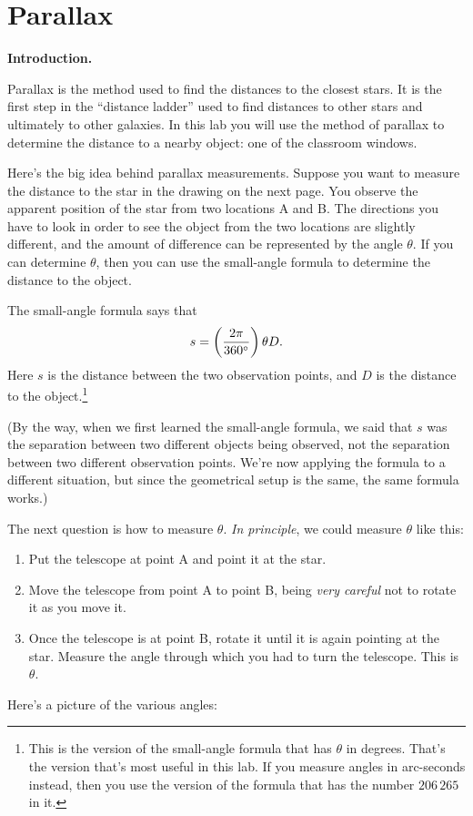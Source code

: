 \chapter{Parallax}


{\bf Introduction.}

Parallax is the method used to find the distances to the closest
stars.  It is the first step in the ``distance ladder'' used to find
distances to other stars and ultimately to other galaxies.  In this
lab you will use the method of parallax to determine the distance to a
nearby object: one of the classroom windows.

Here's the big idea behind parallax measurements.  Suppose you want
to measure the distance to the star in the drawing on the next page.  
You observe
the apparent position of the star from two locations A and B.  The directions
you have to look in order to see the object from the two locations
are slightly different, and the amount of difference can be represented
by the angle $\theta$.  If you can determine $\theta$, then you can
use the small-angle formula to determine the distance to the object.

The small-angle formula says that
$$
s = \left(2\pi\over 360^\circ\right)\theta D.
$$
Here $s$ is the distance between the two observation points, and 
$D$ is the distance to the object.\footnote{This is the version 
of the small-angle formula that has $\theta$ in degrees.  That's
the version that's most useful in this lab.  If you measure angles
in arc-seconds instead, then you use the version of the
formula that has the number $206\,265$ in it.}

(By the way, when we first learned the small-angle formula, we said
that $s$ was the separation between two different objects being
observed, not the separation between two different observation points.
We're now applying the formula to a different situation, but since the
geometrical setup is the same, the same formula works.)

The next question is how to measure $\theta$.  {\it In principle}, we could
measure $\theta$ like this:
\begin{enumerate}
\item Put the telescope at point A and point it at the star.
\item Move the telescope from point A to point B, being {\it very careful}
not to rotate it as you move it.
\item Once the telescope is at point B, rotate it until it is again pointing
at the star.  Measure the angle through which you had to turn the
telescope.  This is $\theta$.
\end{enumerate}
Here's a picture of the various angles:

